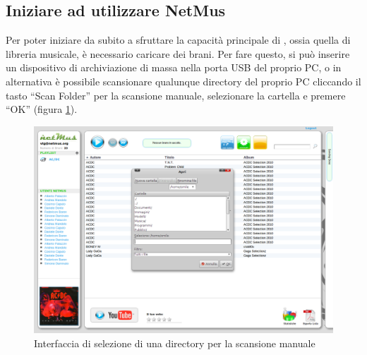 \newpage
\subsection{Iniziare ad utilizzare NetMus}

Per poter iniziare da subito a sfruttare la capacit\`a principale di ,
ossia quella di libreria musicale, \`e necessario caricare dei brani.
Per fare questo, si pu\`o inserire un dispositivo di archiviazione di massa
nella porta USB del proprio PC, o in alternativa \`e possibile scansionare
qualunque directory del proprio PC cliccando il tasto ``Scan Folder'' per la scansione manuale,
selezionare la cartella e premere ``OK'' (figura \ref{fig:scansioneManuale}).\\
\begin{figure}[!htbp]
  \centering
  \includegraphics[width=14cm]{img/MU/scan_manual.png}
\caption{Interfaccia di selezione di una directory per la scansione
manuale}
\label{fig:scansioneManuale}
\end{figure}

